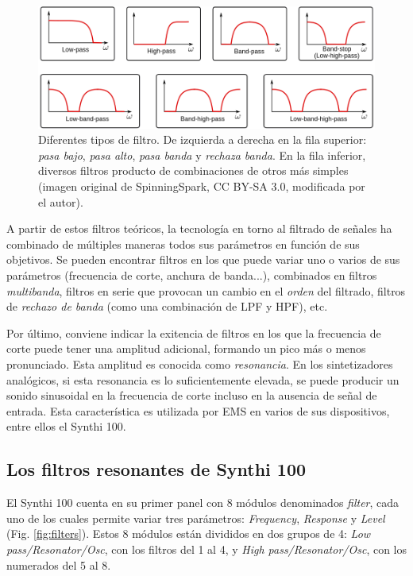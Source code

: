 \begin{figure}
	\centering
	\includegraphics[width=1\textwidth]{images/filtersgraph}
	\caption[Tipos de filtro]{Diferentes tipos de filtro. De izquierda a derecha en la fila superior: \textit{pasa bajo}, \textit{pasa alto}, \textit{pasa banda} y \textit{rechaza banda}. En la fila inferior, diversos filtros producto de combinaciones de otros más simples (imagen original de SpinningSpark, CC BY-SA 3.0, modificada por el autor).}
	\label{fig:filtersgraph}
\end{figure}

A partir de estos filtros teóricos, la tecnología en torno al filtrado de señales ha combinado de múltiples maneras todos sus parámetros en función de sus objetivos. Se pueden encontrar filtros en los que puede variar uno o varios de sus parámetros (frecuencia de corte, anchura de banda...), combinados en filtros \textit{multibanda}, filtros en serie que provocan un cambio en el \textit{orden} del filtrado, filtros de \textit{rechazo de banda} (como una combinación de LPF y HPF), etc.

Por último, conviene indicar la exitencia de filtros en los que la frecuencia de corte puede tener una amplitud adicional, formando un pico más o menos pronunciado. Esta amplitud es conocida como \textit{resonancia}. En los sintetizadores analógicos, si esta resonancia es lo suficientemente elevada, se puede producir un sonido sinusoidal en la frecuencia de corte incluso en la ausencia de señal de entrada. Esta característica es utilizada por EMS en varios de sus dispositivos, entre ellos el Synthi 100.


\subsection{Los filtros resonantes de Synthi 100}

El Synthi 100 cuenta en su primer panel con 8 módulos denominados \textit{filter}, cada uno de los cuales permite variar tres parámetros: \textit{Frequency}, \textit{Response} y \textit{Level} (Fig. \ref{fig:filters}). Estos 8 módulos están divididos en dos grupos de 4: \textit{Low pass/Resonator/Osc}, con los filtros del 1 al 4, y \textit{High pass/Resonator/Osc}, con los numerados del 5 al 8.

